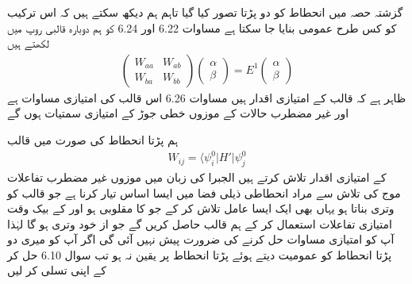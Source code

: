 
گزشتہ حصہ میں انحطاط کو دو پڑتا تصور کیا گیا تاہم ہم دیکھ سکتے ہیں کہ اس ترکیب کو کس طرح عمومی بنایا جا سکتا ہے مساوات 6.22 اور 6.24 کو ہم دوبارہ  قالبی  روپ میں لکھتے ہیں 
\begin{align}
\begin{pmatrix} 
W_{aa} & W_{ab} \\
W_{ba} & W_{bb}
\end{pmatrix}
\begin{pmatrix}
\alpha \\
\beta
\end{pmatrix}
= E^1
\begin{pmatrix}
\alpha \\
\beta
\end{pmatrix}
\end{align}
ظاہر ہے کہ   قالب کے امتیازی اقدار ہیں مساوات 6.26 اس قالب کی امتیازی مساوات ہے  اور غیر مضطرب حالات کے موزوں خطی جوڑ  کے امتیازی سمتیات ہوں گے

 ہم  پڑتا انحطاط کی صورت میں   قالب
\begin{align}
W_{i j} = \langle \psi_i^0 | H' | \psi_j^0
\end{align}
کے امتیازی اقدار تلاش کرتے ہیں الجبرا کی زبان میں موزوں غیر مضطرب تفاعلات موج کی تلاش سے مراد انحطاطی  ذيلی فضا میں ایسا اساس تیار کرنا ہے جو قالب  کو  وتری بناتا ہو یہاں بھی ایک ایسا عامل  تلاش کر کے جو  کا  مقلوبی ہو  اور  کے بیک وقت امتیازی تفاعلات استعمال کر کے ہم قالب  حاصل کریں گے جو از خود وتری ہو گا لہٰذا  آپ  کو امتیازی مساوات حل کرنے کی ضرورت پیش نہیں آئی گی اگر آپ کو میری دو پڑتا انحطاط کو عمومیت دیتے ہوئے  پڑتا انحطاط پر یقین نہ ہو تب سوال 6.10 حل کر کے  اپنی تسلی کر لیں 


